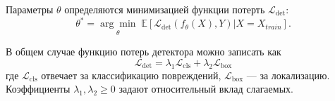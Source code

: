 \documentclass[12pt,a4paper]{article}
\newcommand{\E}{\mathbb{E}}
\newcommand{\Loss}{\mathcal{L}}
\begin{document}
Параметры $\theta$ определяются минимизацией функции потерть $\Loss_{\mathrm{det}}$:
\begin{equation*}
    \theta^*=\underset{\theta}{\arg\min}\;
    \E
    \left[\Loss_{\mathrm{det}}(f_\theta(X),Y) |  X = X_{train}\right].
    \label{eq:det-main}
\end{equation*}

В общем случае функцию потерь детектора можно записать как
\begin{equation}
    \Loss_{\mathrm{det}}
    =\lambda_1\Loss_{\mathrm{cls}}
    +\lambda_2\Loss_{\mathrm{box}}
\end{equation}
где $\Loss_{\mathrm{cls}}$ отвечает за классификацию
 повреждений, $\Loss_{\mathrm{box}}$ --- за локализацию.
Коэффициенты $\lambda_1,\lambda_2 \geq 0 $ задают относительный вклад слагаемых.




\end{document}

